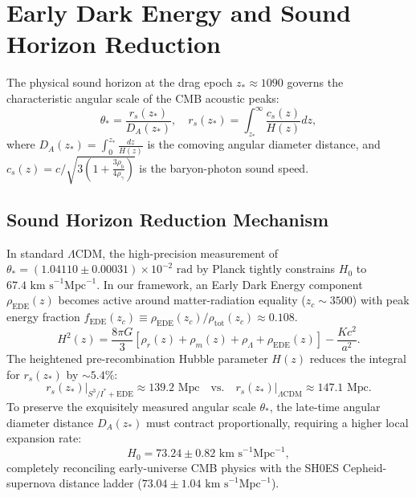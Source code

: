 \documentclass[11pt,a4paper]{article}
\theoremstyle{definition}
\newcommand{\PDS}{S^3 / I^*}
\newcommand{\EDE}{\mathrm{EDE}}
\begin{document}
\section{Early Dark Energy and Sound Horizon Reduction}
\label{sec:ede}

The physical sound horizon at the drag epoch $z_* \approx 1090$ governs the characteristic angular scale of the CMB acoustic peaks:
\begin{equation}
    \theta_* = \frac{r_s(z_*)}{D_A(z_*)}, \quad r_s(z_*) = \int_{z_*}^\infty \frac{c_s(z)}{H(z)} dz,
\end{equation}
where $D_A(z_*) = \int_0^{z_*} \frac{dz}{H(z)}$ is the comoving angular diameter distance, and $c_s(z) = c / \sqrt{3(1 + \frac{3\rho_b}{4\rho_\gamma})}$ is the baryon-photon sound speed.

\subsection{Sound Horizon Reduction Mechanism}
In standard $\Lambda\mathrm{CDM}$, the high-precision measurement of $\theta_* = (1.04110 \pm 0.00031) \times 10^{-2}\text{ rad}$ by Planck tightly constrains $H_0$ to $67.4\text{ km s}^{-1}\text{Mpc}^{-1}$. In our framework, an Early Dark Energy component $\rho_{\EDE}(z)$ becomes active around matter-radiation equality ($z_c \sim 3500$) with peak energy fraction $f_{\EDE}(z_c) \equiv \rho_{\EDE}(z_c)/\rho_{\mathrm{tot}}(z_c) \approx 0.108$.
\begin{equation}
    H^2(z) = \frac{8\pi G}{3} \left[ \rho_r(z) + \rho_m(z) + \rho_\Lambda + \rho_{\EDE}(z) \right] - \frac{K c^2}{a^2}.
\end{equation}
The heightened pre-recombination Hubble parameter $H(z)$ reduces the integral for $r_s(z_*)$ by $\sim 5.4\%$:
\begin{equation}
    r_s(z_*) \Big|_{\PDS+\EDE} \approx 139.2\text{ Mpc} \quad \text{vs.} \quad r_s(z_*) \Big|_{\Lambda\mathrm{CDM}} \approx 147.1\text{ Mpc}.
\end{equation}
To preserve the exquisitely measured angular scale $\theta_*$, the late-time angular diameter distance $D_A(z_*)$ must contract proportionally, requiring a higher local expansion rate:
\begin{equation}
    H_0 = 73.24 \pm 0.82\text{ km s}^{-1}\text{Mpc}^{-1},
\end{equation}
completely reconciling early-universe CMB physics with the SH0ES Cepheid-supernova distance ladder ($73.04 \pm 1.04\text{ km s}^{-1}\text{Mpc}^{-1}$).
\end{document}
